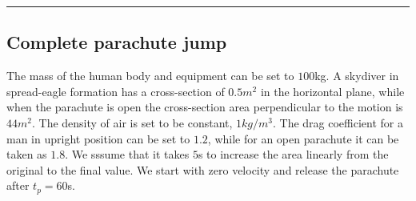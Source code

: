 \documentclass[letterpaper,10pt,english]{/usr/share/sphinx/texinputs/sphinxhowto}
\begin{document}
        
    
\begin{center}\rule{3in}{0.4pt}\end{center}

\subsection{Complete parachute jump}

The mass of the human body and equipment can be set to $100$kg. A
skydiver in spread-eagle formation has a cross-section of $0.5 m^2$ in
the horizontal plane, while when the parachute is open the cross-section
area perpendicular to the motion is $44 m^2$. The density of air is set
to be constant, $1 kg/m^3$. The drag coefficient for a man in upright
position can be set to $1.2$, while for an open parachute it can be
taken as $1.8$. We sssume that it takes $5$s to increase the area
linearly from the original to the final value. We start with zero
velocity and release the parachute after $t_p=60$s.

\end{document}
